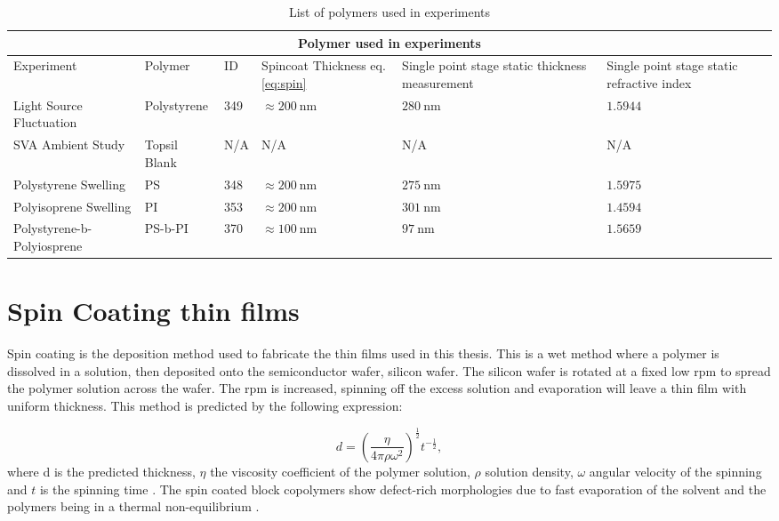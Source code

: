 \documentclass[MasterThesisMain.tex]{subfiles}
\begin{document}
\begin{table}
	\caption{List of polymers used in experiments}
\begin{tabular}{ |p{3cm}||p{2cm}|p{2cm}|p{2cm}|p{2cm}|p{2cm}|  }
 \hline
 \multicolumn{6}{|c|}{Polymer used in experiments} \\
 \hline
 Experiment & Polymer & ID & Spincoat Thickness eq.\ref{eq:spin} & Single point stage static thickness measurement & Single point stage static refractive index\\
 \hline
 Light Source Fluctuation & Polystyrene & 349 & $\approx\SI{200}{\nano\meter}$ & $\SI{280}{\nano\meter}$ & $1.5944$  \\
 SVA Ambient Study & Topsil Blank & N/A & N/A & N/A & N/A  \\
 Polystyrene Swelling & PS  & 348  & $\approx\SI{200}{\nano\meter}$ & $\SI{275}{\nano\meter}$ & $1.5975$  \\
 Polyisoprene Swelling & PI  & 353 & $\approx\SI{200}{\nano\meter}$ & $\SI{301}{\nano\meter}$ & $1.4594$  \\
 Polystyrene-b-Polyiosprene & PS-b-PI & 370 & $\approx\SI{100}{\nano\meter}$ & $\SI{97}{\nano\meter}$ & $1.5659$ \\  
\hline
\end{tabular}
\label{tab:polymers}
\end{table}

\section{Spin Coating thin films}
Spin coating is the deposition method used to fabricate the thin films used in this thesis. This is a wet method where a polymer is dissolved in a solution, then deposited onto the semiconductor wafer, silicon wafer. The silicon wafer is rotated at a fixed low rpm to spread the polymer solution across the wafer. The rpm is increased, spinning off the excess solution and evaporation will leave a thin film with uniform thickness. This method is predicted by the following expression:

\begin{equation}\label{eq:spin}
d = \left(\frac{\eta}{4\pi\rho\omega^2}\right)^{\frac{1}{2}} t^{-\frac{1}{2}},
\end{equation}  
where d is the predicted thickness, $\eta$ the viscosity coefficient of the polymer solution, $\rho$ solution density, $\omega$ angular velocity of the spinning and $t$ is the spinning time \cite{petty2008molecular}. The spin coated block copolymers show defect-rich morphologies due to fast evaporation of the solvent and the polymers being in a thermal non-equilibrium \cite{PosseltBCP}.
\end{document}
